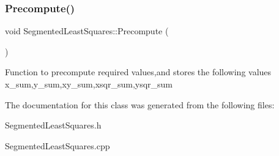 \subsubsection{\texorpdfstring{Precompute()}{Precompute()}}
{\footnotesize\ttfamily void Segmented\+Least\+Squares\+::\+Precompute (\begin{DoxyParamCaption}{ }\end{DoxyParamCaption})\hspace{0.3cm}{\ttfamily [private]}}

Function to precompute required values,and stores the following values x\+\_\+sum,y\+\_\+sum,xy\+\_\+sum,xsqr\+\_\+sum,ysqr\+\_\+sum 

The documentation for this class was generated from the following files\+:\begin{DoxyCompactItemize}
\item 
Segmented\+Least\+Squares.\+h\item 
Segmented\+Least\+Squares.\+cpp\end{DoxyCompactItemize}
